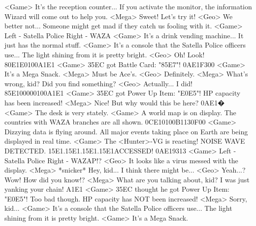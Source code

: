 <Game> It's the reception counter... 
If you activate the monitor, the information Wizard will come out to help you. 
<Mega> Sweet! Let's try it! 
<Geo> We better not... Someone might get mad if they catch us fooling with it. 
<Game> Left - Satella Police              Right - WAZA 
<Game> It's a drink vending machine... 
It just has the normal stuff. 
<Game> It's a console that the Satella Police officers use... 
The light shining from it is pretty bright. 
<Geo> Oh! Look! 
{80}{E1}E{01}{00}{A1}{E1} 
<Game> {35}{EC} got Battle Card: "{85}{E7}"! 
{0A}{E1}{F3}{00}
<Game> It's a Mega Snack. 
<Mega> Must be Ace's. 
<Geo> Definitely. 
<Mega> What's wrong, kid? Did you find something? 
<Geo> Actually... 
I did! 
{85}{E1}{00}{00}{01}{00}{A1}{E1} 
<Game> {35}{EC} got Power Up Item: "{E0}{E5}"! 
HP capacity has been increased! 
<Mega> Nice! But why would this be here? 
{0A}{E1}�
<Game> The desk is very stately. 
<Game> A world map is on display. 
The countries with WAZA branches are all shown. 
{0C}{E1}{01}{00}{B1}{13}{0F}{00}
<Game> Dizzying data is flying around. 
All major events taking place on Earth are being displayed in real time. 
<Game> The <Hunter>-VG is reacting! 
NOISE WAVE DETECTED. {15}{E1}.{15}{E1}.{15}{E1}.{15}{E1}ACCESSED! 
{0A}{E1}{93}{13}
<Game> Left - Satella Police            Right - WAZAP!? 
<Geo> It looks like a virus messed with the display. 
<Mega> *snicker* Hey, kid... I think there might be... 
<Geo> Yeah...? 
Wow! How did you know!? 
<Mega> What are you talking about, kid? I was just yanking your chain! 
{A1}{E1} 
<Game> {35}{EC} thought he got Power Up Item: "{E0}{E5}"! 
Too bad though. HP capacity has NOT been increased! 
<Mega> Sorry, kid... 
<Game> It's a console that the Satella Police officers use... 
The light shining from it is pretty bright. 
<Game> It's a Mega Snack. 
